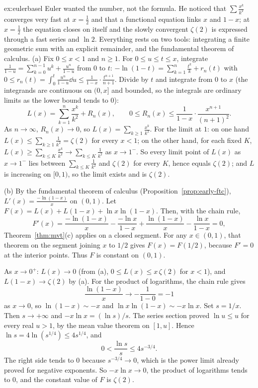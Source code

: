 \begin{solution}{ex:eulerbasel}
\idea Euler wanted the number, not the formula. He noticed that $\sum\frac{x^k}{k^2}$ converges very fast at $x=\frac12$ and that a functional equation links $x$ and $1-x$; at $x=\frac12$ the equation closes on itself and the slowly convergent $\zeta(2)$ is expressed through a fast series and $\ln2$. Everything rests on two tools: integrating a finite geometric sum with an explicit remainder, and the fundamental theorem of calculus.
\writeup (a) Fix $0\le x<1$ and $n\ge1$. For $0\le u\le t\le x$, integrate $\frac1{1-u}=\sum_{k=0}^{n-1}u^k+\frac{u^n}{1-u}$ from $0$ to $t$:
$-\ln(1-t)=\sum_{k=1}^n\frac{t^k}k+r_n(t)$ with $0\le r_n(t)=\int_0^t\frac{u^n}{1-u}\dd u\le\frac1{1-x}\cdot\frac{t^{n+1}}{n+1}$.
Divide by $t$ and integrate from $0$ to $x$ (the integrands are continuous on $(0,x]$ and bounded, so the integrals are ordinary limits as the lower bound tends to $0$):
\[
L(x)=\sum_{k=1}^n\frac{x^k}{k^2}+R_n(x),\qquad0\le R_n(x)\le\frac1{1-x}\cdot\frac{x^{n+1}}{(n+1)^2}.
\]
As $n\to\infty$, $R_n(x)\to0$, so $L(x)=\sum_{k\ge1}\frac{x^k}{k^2}$. For the limit at $1$: on one hand $L(x)\le\sum_{k\ge1}\frac1{k^2}=\zeta(2)$ for every $x<1$; on the other hand, for each fixed $K$, $L(x)\ge\sum_{k\le K}\frac{x^k}{k^2}\to\sum_{k\le K}\frac1{k^2}$ as $x\to1^-$. So every limit point of $L(x)$ as $x\to1^-$ lies between $\sum_{k\le K}\frac1{k^2}$ and $\zeta(2)$ for every $K$, hence equals $\zeta(2)$; and $L$ is increasing on $[0,1)$, so the limit exists and is $\zeta(2)$.

(b) By the fundamental theorem of calculus (Proposition~\ref{prop:early-ftc}), $L'(x)=\frac{-\ln(1-x)}x$ on $(0,1)$. Let $F(x)=L(x)+L(1-x)+\ln x\ln(1-x)$. Then, with the chain rule,
\[
F'(x)=\frac{-\ln(1-x)}x-\frac{-\ln x}{1-x}+\frac{\ln(1-x)}x-\frac{\ln x}{1-x}=0,
\]
Theorem~\ref{thm:mvt}(c) applies on a closed segment. For any $x\in(0,1)$, that theorem on the segment joining $x$ to $1/2$ gives $F(x)=F(1/2)$, because $F'=0$ at the interior points. Thus $F$ is constant on $(0,1)$.

As $x\to0^+$: $L(x)\to0$ (from (a), $0\le L(x)\le x\,\zeta(2)$ for $x<1$), and $L(1-x)\to\zeta(2)$ by (a). For the product of logarithms, the chain rule gives
\[
\frac{\ln(1-x)}{x}\to -\frac1{1-0}=-1
\]
as $x\to0$, so $\ln(1-x)\sim -x$ and $\ln x\ln(1-x)\sim -x\ln x$. Set $s=1/x$. Then $s\to+\infty$ and $-x\ln x=(\ln s)/s$. The series section proved $\ln u\le u$ for every real $u>1$, by the mean value theorem on $[1,u]$. Hence $\ln s=4\ln(s^{1/4})\le 4s^{1/4}$, and
\[
0<\frac{\ln s}s\le 4s^{-3/4}.
\]
The right side tends to $0$ because $s^{-3/4}\to0$, which is the power limit already proved for negative exponents. So $-x\ln x\to0$, the product of logarithms tends to $0$, and the constant value of $F$ is $\zeta(2)$.


\end{solution}
